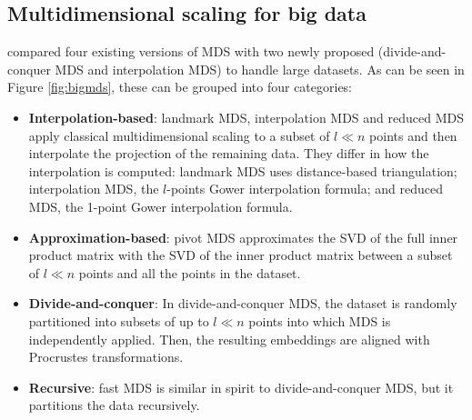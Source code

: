 \subsection{Multidimensional scaling for big data}
\label{sec:MDS-big-data}

\citet{Delicado2024} compared four existing versions of MDS with two newly proposed (divide-and-conquer MDS and interpolation MDS) to handle large datasets. As can be seen in Figure \ref{fig:bigmds}, these can be grouped into four categories:

\begin{itemize}
    \item \textbf{Interpolation-based}: landmark MDS, interpolation MDS and reduced MDS apply classical multidimensional scaling to a subset of $l \ll n$ points and then interpolate the projection of the remaining data. They differ in how the interpolation is computed: landmark MDS uses distance-based triangulation; interpolation MDS, the $l$-points Gower interpolation formula; and reduced MDS, the 1-point Gower interpolation formula.
    \item \textbf{Approximation-based}: pivot MDS approximates the SVD of the full inner product matrix with the SVD of the inner product matrix between a subset of $l \ll n$ points and all the points in the dataset.
    \item \textbf{Divide-and-conquer}: In divide-and-conquer MDS, the dataset is randomly partitioned into subsets of up to $l \ll n$ points into which MDS is independently applied. Then, the resulting embeddings are aligned with Procrustes transformations.
    \item \textbf{Recursive}: fast MDS is similar in spirit to divide-and-conquer MDS, but it partitions the data recursively. 
\end{itemize}

